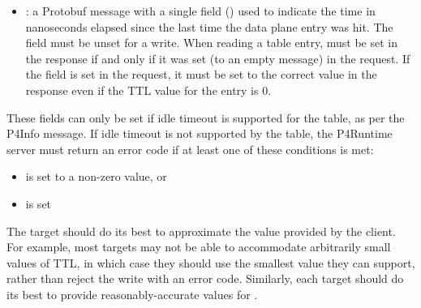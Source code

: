 \documentclass[11pt]{article}
\begin{document}
{\begin{itemize}
\item{}
: a Protobuf message with a single field ()
used to indicate the time in nanoseconds elapsed since the last time the
data plane entry was hit. The  field must be unset for a
 write. When reading a table entry,  must be
set in the response if and only if it was set (to an empty message) in the
request. If the field is set in the request, it must be set to the correct
value in the response even if the TTL value for the entry is 0.%
\end{itemize}%

\noindent{}These fields can only be set if idle timeout is supported for the table, as per
the P4Info message. If idle timeout is not supported by the table, the P4Runtime
server must return an  error code if at least one of these
conditions is met:%

\begin{itemize}[noitemsep,topsep=\mdcompacttopsep]%

\item{} is set to a non-zero value, or%

\item{} is set%
\end{itemize}%

\noindent{}The target should do its best to approximate the  value
provided by the client. For example, most targets may not be able to accommodate
arbitrarily small values of TTL, in which case they should use the smallest
value they can support, rather than reject the  write with an error
code. Similarly, each target should do its best to provide reasonably-accurate
values for .%

}
\end{document}
